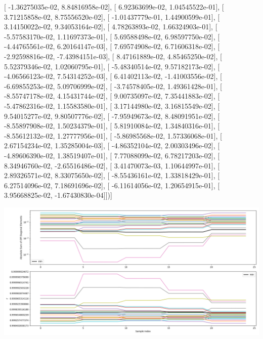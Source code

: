 \documentclass{article}
\begin{document}
       [ -1.36275035e-02,   8.84816958e-02],
       [  6.92363699e-02,   1.04545522e-01],
       [  3.71215858e-02,   8.75556520e-02],
       [ -1.01437779e-01,   1.44900599e-01],
       [  3.14150022e-02,   9.34053164e-02],
       [  4.78263893e-02,   1.66324903e-01],
       [ -5.57583170e-02,   1.11697373e-01],
       [  5.69588498e-02,   6.98597750e-02],
       [ -4.44765561e-02,   6.20164147e-03],
       [  7.69574908e-02,   6.71606318e-02],
       [ -2.92598816e-02,  -7.43984151e-03],
       [  8.47161889e-02,   4.85465250e-02],
       [  5.52379346e-02,   1.02060795e-01],
       [ -5.48340514e-02,   9.57182173e-02],
       [ -4.06566123e-02,   7.54314252e-03],
       [  6.41402113e-02,  -1.41003556e-02],
       [ -6.69855253e-02,   5.09706999e-02],
       [ -3.74578405e-02,   1.49361428e-01],
       [ -8.55747178e-02,   4.15431744e-02],
       [  9.00735097e-02,   7.35441883e-02],
       [ -5.47862316e-02,   1.15583580e-01],
       [  3.17144980e-02,   3.16815549e-02],
       [  9.54015277e-02,   9.80507776e-02],
       [ -7.95949673e-02,   8.48091951e-02],
       [ -8.55897908e-02,   1.50234379e-01],
       [  5.81910084e-02,   1.34840316e-01],
       [ -8.55612132e-02,   1.27777956e-01],
       [ -5.86985568e-02,   1.57336068e-01],
       [  2.67154234e-02,   1.35285004e-03],
       [ -4.86352104e-02,   2.00303496e-02],
       [ -4.89606390e-02,   1.38519407e-01],
       [  7.77088099e-02,   6.78217203e-02],
       [  8.34946760e-02,  -2.65516486e-02],
       [  3.41470073e-03,   1.10644997e-01],
       [  2.89326571e-02,   8.33075650e-02],
       [ -8.55436161e-02,   1.33818429e-01],
       [  6.27514096e-02,   7.18691696e-02],
       [ -6.11614056e-02,   1.20654915e-01],
       [  3.95668825e-02,  -1.67430830e-04]])]
\begin{center}
\includegraphics[scale=.9]{report_pickled_controls180/control_dpn_all.png}

\end{center}
\end{document}
